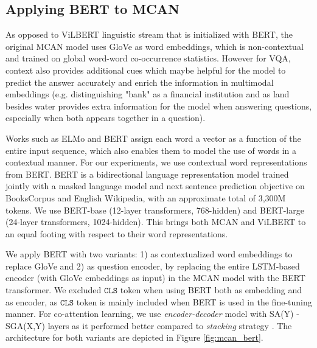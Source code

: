 \documentclass{article}
\begin{document}
\subsection{Applying BERT to MCAN}
As opposed to ViLBERT linguistic stream that is initialized with BERT, the original MCAN model uses GloVe as word embeddings, which is non-contextual and trained on global word-word co-occurrence statistics. However for VQA, context also provides additional cues which maybe helpful for the model to predict the answer accurately and enrich the information in multimodal embeddings (e.g. distinguishing "bank" as a financial institution and as land besides water provides extra information for the model when answering questions, especially when both appears together in a question). 

Works such as ELMo \citep{peters2018elmo} and BERT \citep{devlin-etal-2019-bert} assign each word a vector as a function of the entire input sequence, which also enables them to model the use of words in a contextual manner. For our experiments, we use contextual word representations from BERT. BERT is a bidirectional language representation model trained jointly with a masked language model and next sentence prediction objective on BooksCorpus \citep{bookscorpus} and English Wikipedia, with an approximate total of 3,300M tokens. We use BERT-base (12-layer transformers, 768-hidden) and BERT-large (24-layer transformers, 1024-hidden). This brings both MCAN and ViLBERT to an equal footing with respect to their word representations.

We apply BERT with two variants: 1) as contextualized word embeddings to replace GloVe and 2) as question encoder, by replacing the entire LSTM-based encoder (with GloVe embeddings as input) in the MCAN model with the BERT transformer. We excluded $\mathtt{CLS}$ token when using BERT both as embedding and as encoder, as $\mathtt{CLS}$ token is mainly included when BERT is used in the fine-tuning manner. For co-attention learning, we use \textit{encoder-decoder} model with SA(Y) - SGA(X,Y) layers as it performed better compared to \textit{stacking} strategy \citep{yu2019mcan}. The architecture for both variants are depicted in Figure \ref{fig:mcan_bert}.
\end{document}
